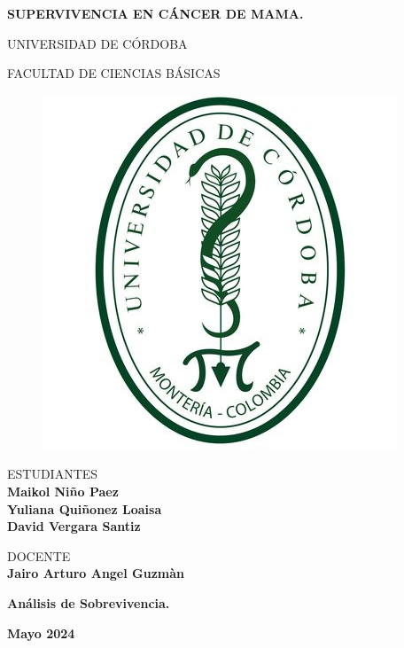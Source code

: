 \documentclass[10pt,a4paper]{article}
\begin{document}
\begin{center}

\vspace{1.7cm}    
    \Large
    \textbf{ SUPERVIVENCIA EN CÁNCER DE MAMA. }
  
    \vspace{0.7cm}
    \LARGE
    UNIVERSIDAD DE CÓRDOBA 
    
    \vspace{0.8cm}
    \LARGE
    FACULTAD DE CIENCIAS BÁSICAS
  \vspace{1.5cm}  
  \begin{figure}[H]
\centering
  
  
  \includegraphics[scale=0.4]{imagenes/u.jpeg}   
   
\end{figure}      
  
    
    
    
    \vspace{1.5cm}
    \normalsize    
     
    \vspace{.3cm}
    ESTUDIANTES \\
    \large
    \textbf{Maikol Niño Paez \\ Yuliana Quiñonez Loaisa \\David Vergara Santiz }
    
    \vspace{1.5cm}
    \normalsize    
    DOCENTE \\
    
    \large
    \textbf{Jairo Arturo Angel Guzmàn }
    
    \vspace{1cm}
    \normalsize    
  
    \vspace{.2cm}
    \large
    \textbf{Análisis de Sobrevivencia.}
    
    \vspace{0.7 cm}
    \textbf{Mayo 2024}
\end{center}
\end{document}
